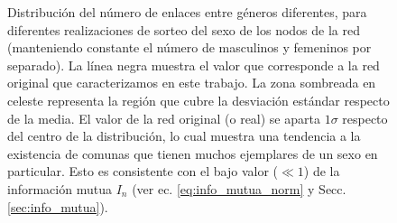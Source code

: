 \begin{figure}
    \centering
    \caption{
    Distribuci\'on del n\'umero de enlaces entre g\'eneros diferentes, para diferentes realizaciones de sorteo del sexo de los nodos de la red (manteniendo constante el n\'umero de masculinos y femeninos por separado).
    La l\'inea negra muestra el valor que corresponde a la red original que caracterizamos en este trabajo.
    La zona sombreada en celeste representa la regi\'on que cubre la desviaci\'on est\'andar respecto de la media.
    El valor de la red original (o real) se aparta $1 \sigma$ respecto del centro de la distribuci\'on, lo cual muestra una tendencia a la existencia de comunas que tienen muchos ejemplares de un sexo en particular.
    Esto es consistente con el bajo valor ($\ll 1$) de la informaci\'on mutua $I_n$ (ver ec. \ref{eq:info_mutua_norm} y Secc. \ref{sec:info_mutua}).
    }
\label{fig:hist_sort_sex}
\end{figure}

